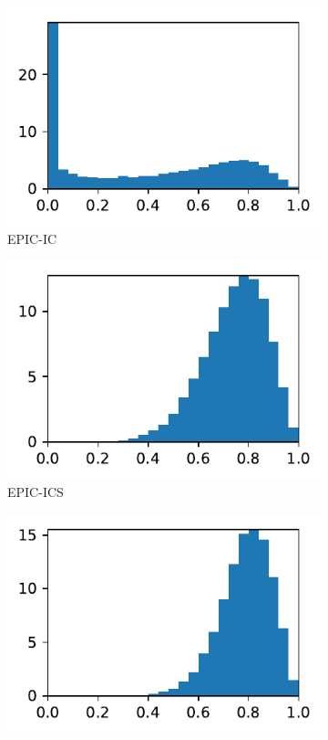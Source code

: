 \documentclass[3p,times,procedia,number]{elsarticle}
\begin{document}
\begin{figure}
\begin{subfigure}{.16\textwidth}
\centering
\includegraphics[width=\textwidth]{epic-ic-cube-cylinder-polar-2-quality.pdf}
\caption{EPIC-IC}
\end{subfigure}
\begin{subfigure}{.16\textwidth}
\centering
\includegraphics[width=\textwidth]{epic-ics-cube-cylinder-polar-2-quality.pdf}
\caption{EPIC-ICS}
\end{subfigure}
\begin{subfigure}{.16\textwidth}
\centering
\includegraphics[width=\textwidth]{epic-icsm-cube-cylinder-polar-2-quality.pdf}

\end{subfigure}
\end{figure}
\end{document}
